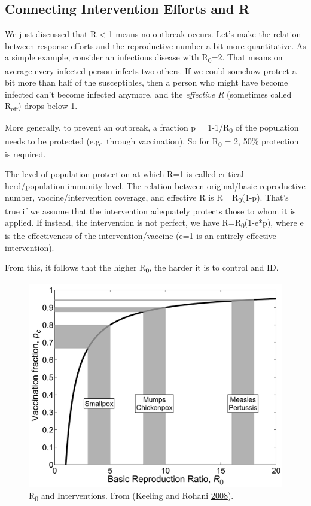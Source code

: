 \documentclass[]{article}
\theoremstyle{definition}
\theoremstyle{definition}
\theoremstyle{definition}
\theoremstyle{remark}
\begin{document}
\subsection{Connecting Intervention Efforts and
R}\label{connecting-intervention-efforts-and-r}

We just discussed that R \textless{} 1 means no outbreak occurs. Let's
make the relation between response efforts and the reproductive number a
bit more quantitative. As a simple example, consider an infectious
disease with R\textsubscript{0}=2. That means on average every infected
person infects two others. If we could somehow protect a bit more than
half of the susceptibles, then a person who might have become infected
can't become infected anymore, and the \emph{effective R} (sometimes
called R\textsubscript{eff}) drops below 1.

More generally, to prevent an outbreak, a fraction p =
1-1/R\textsubscript{0} of the population needs to be protected
(e.g.~through vaccination). So for R\textsubscript{0} = 2, 50\%
protection is required.

The level of population protection at which R=1 is called critical
herd/population immunity level. The relation between original/basic
reproductive number, vaccine/intervention coverage, and effective R is
R= R\textsubscript{0}(1-p). That's true if we assume that the
intervention adequately protects those to whom it is applied. If
instead, the intervention is not perfect, we have
R=R\textsubscript{0}(1-e*p), where e is the effectiveness of the
intervention/vaccine (e=1 is an entirely effective intervention).

From this, it follows that the higher R\textsubscript{0}, the harder it
is to control and ID.

\begin{figure}
\centering
\includegraphics{./images/kr-R0intervention.png}
\caption{R\textsubscript{0} and Interventions. From (Keeling and Rohani
\protect\hyperlink{ref-keeling08}{2008}).}
\end{figure}
\end{document}
